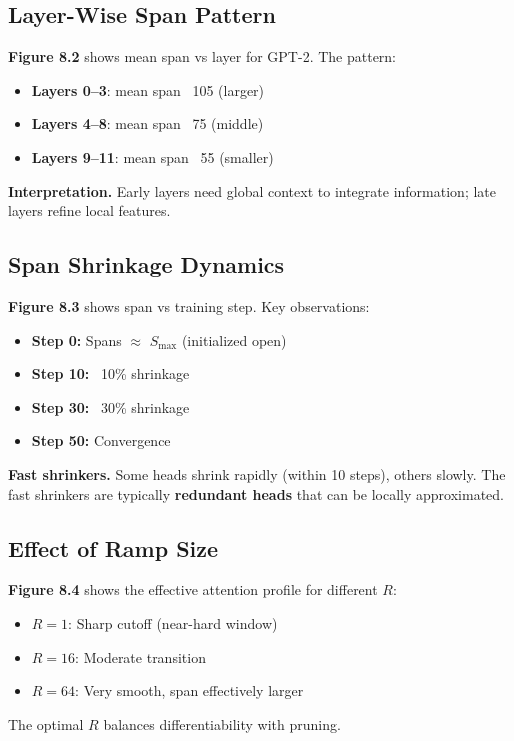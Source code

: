 \subsection{Layer-Wise Span Pattern}

\textbf{Figure 8.2} shows mean span vs layer for GPT-2. The pattern:

\begin{itemize}
\item \textbf{Layers 0--3}: mean span ~105 (larger)
\item \textbf{Layers 4--8}: mean span ~75 (middle)
\item \textbf{Layers 9--11}: mean span ~55 (smaller)

\end{itemize}
\textbf{Interpretation.} Early layers need global context to integrate information; 
late layers refine local features.

\subsection{Span Shrinkage Dynamics}

\textbf{Figure 8.3} shows span vs training step. Key observations:

\begin{itemize}
\item \textbf{Step 0:} Spans $\approx$ $S_\text{max}$ (initialized open)
\item \textbf{Step 10:} ~10\% shrinkage
\item \textbf{Step 30:} ~30\% shrinkage
\item \textbf{Step 50:} Convergence

\end{itemize}
\textbf{Fast shrinkers.} Some heads shrink rapidly (within 10 steps), others 
slowly. The fast shrinkers are typically \textbf{redundant heads} that can be 
locally approximated.

\subsection{Effect of Ramp Size}

\textbf{Figure 8.4} shows the effective attention profile for different $R$:

\begin{itemize}
\item $R = 1$: Sharp cutoff (near-hard window)
\item $R = 16$: Moderate transition
\item $R = 64$: Very smooth, span effectively larger

\end{itemize}
The optimal $R$ balances differentiability with pruning.

